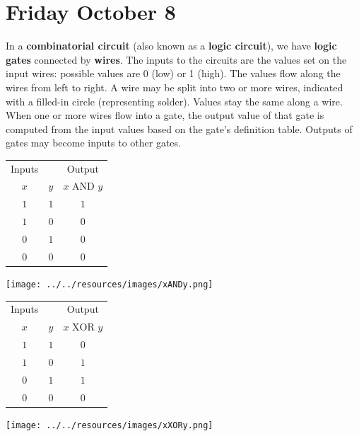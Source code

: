 \documentclass[12pt, oneside]{article}
\begin{document}
\section*{Friday October 8}


In a {\bf combinatorial circuit} (also known as
a {\bf logic circuit}), we have {\bf logic gates} 
connected
by {\bf wires}. The inputs to the circuits are the 
values set on the input wires: possible
values are 0 (low) or 1 (high). The values
flow along the wires from left to right.
A wire may be split into two or more wires, 
indicated with a filled-in circle (representing
solder). Values stay the same along a wire. When 
one or more wires flow into a gate, the output 
value of that gate is computed
from the input values based on the gate's definition
table. Outputs of gates may become inputs to other
gates.  

\begin{multicols}{2}
\begin{center}\begin{tabular}{cc|c}
Inputs &  & Output \\
$x$ & $y$ & $x \text{ AND } y$  \\
\hline
$1$ & $1$ & $1$\\
$1$ & $0$ & $0$\\
$0$ & $1$ & $0$\\
$0$ & $0$ & $0$\\
\end{tabular}\end{center}
\columnbreak
\begin{center}\texttt{[image: ../../resources/images/xANDy.png]} \end{center}
\end{multicols}

\begin{multicols}{2}
\begin{center}\begin{tabular}{cc|c}
Inputs &  & Output \\
$x$ & $y$ & $x \text{ XOR } y$  \\
\hline
$1$ & $1$ & $0$\\
$1$ & $0$ & $1$\\
$0$ & $1$ & $1$\\
$0$ & $0$ & $0$\\
\end{tabular}\end{center}
\columnbreak
\begin{center}\texttt{[image: ../../resources/images/xXORy.png]} \end{center}
\end{multicols}
\end{document}
